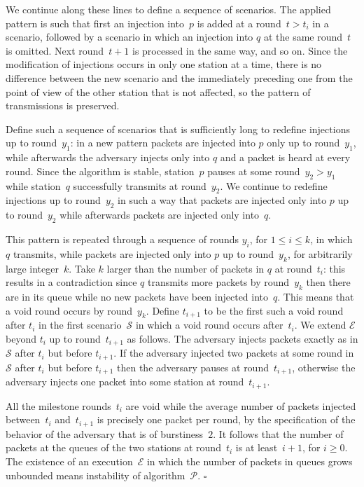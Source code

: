 \documentclass[11pt]{article}
\newcommand{\cE}{\mathcal{E}}
\newcommand{\cP}{\mathcal{P}}
\newcommand{\cS}{\mathcal{S}}
\newcommand{\qed}{\hfill $\square$ \smallbreak}
\newenvironment{proof}{\noindent{\bf Proof:}}{\qed}
\begin{document}
\begin{proof}
We continue along these lines to define a sequence of scenarios.
The applied pattern is such that first an injection into~$p$ is added at a round~$t> t_i$ in a scenario, followed by a scenario in which an injection into $q$ at the same round~$t$ is omitted.
Next round~$t+1$ is processed in the same way, and so on.
Since the modification of injections occurs in only one station at a time, there is no difference between the new scenario and the immediately preceding one from the point of view of the other station that is not affected, so the pattern of transmissions is preserved.

Define such a sequence of scenarios that is sufficiently long to redefine injections up to round~$y_1$: in a new pattern packets are injected into $p$ only up to round~$y_1$, while afterwards the adversary injects only into $q$ and a packet is heard at every round.
Since the algorithm is stable, station~$p$ pauses at some round~$y_2> y_1$ while station~$q$ successfully transmits at round~$y_2$.
We continue to redefine injections up to round~$y_2$ in such a way that packets are injected only into $p$ up to round~$y_2$ while afterwards packets are injected only into~$q$.

This pattern is repeated through a sequence of rounds $y_i$, for $1\le i\le k$, in which $q$ transmits, while packets are injected only into $p$ up to round~$y_k$, for arbitrarily large integer~$k$.
Take $k$ larger than the number of packets in $q$ at round~$t_i$: this results in a contradiction since $q$ transmits more packets by round~$y_k$ then there are in its queue while no new packets have been injected into~$q$.
This means that a void round occurs by round~$y_k$.
Define $t_{i+1}$ to be the first such a void round after $t_i$ in the first scenario~$\cS$ in which a void round occurs after~$t_i$.
We extend $\cE$ beyond $t_i$ up to round~$t_{i+1}$ as follows.
The adversary injects packets exactly as in $\cS$ after $t_i$ but before $t_{i+1}$.
If the adversary injected two packets at some round in $\cS$ after $t_i$ but before $t_{i+1}$ then the adversary pauses at round~$t_{i+1}$, otherwise the adversary injects one packet into some station at round~$t_{i+1}$.

All the milestone rounds~$t_i$ are void while the average number of packets injected between~$t_i$ and~$t_{i+1}$ is precisely one packet per round, by the specification of the behavior of the adversary that is of burstiness~$2$.
It follows that the number of packets at the queues of the two stations at round~$t_{i}$ is at least~$i+1$, for $i \ge 0$.
The existence of an execution~$\cE$ in which the number of packets in queues grows unbounded means  instability of algorithm~$\cP$.
\end{proof}
\end{document}
